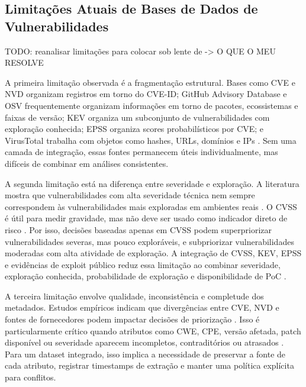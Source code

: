 \subsection{Limitações Atuais de Bases de Dados de Vulnerabilidades}

TODO: reanalisar limitações para colocar sob lente de -> O QUE O MEU RESOLVE

A primeira limitação observada é a fragmentação estrutural. Bases como CVE e NVD organizam registros em torno do CVE-ID; GitHub Advisory Database e OSV frequentemente organizam informações em torno de pacotes, ecossistemas e faixas de versão; KEV organiza um subconjunto de vulnerabilidades com exploração conhecida; EPSS organiza scores probabilísticos por CVE; e VirusTotal trabalha com objetos como hashes, URLs, domínios e IPs \cite{cve_program_overview,nvd_home,github_advisory_database_docs,osv_database,osv_schema,cisa_kev_catalog,first_epss,virustotal_api_v3}. Sem uma camada de integração, essas fontes permanecem úteis individualmente, mas difíceis de combinar em análises consistentes.

A segunda limitação está na diferença entre severidade e exploração. A literatura mostra que vulnerabilidades com alta severidade técnica nem sempre correspondem às vulnerabilidades mais exploradas em ambientes reais \cite{allodi_massacci_2014_cvss_exploits}. O CVSS é útil para medir gravidade, mas não deve ser usado como indicador direto de risco \cite{nvd_cvss_metrics,first_cvss}. Por isso, decisões baseadas apenas em CVSS podem superpriorizar vulnerabilidades severas, mas pouco exploráveis, e subpriorizar vulnerabilidades moderadas com alta atividade de exploração. A integração de CVSS, KEV, EPSS e evidências de exploit público reduz essa limitação ao combinar severidade, exploração conhecida, probabilidade de exploração e disponibilidade de PoC \cite{allodi_massacci_2014_cvss_exploits,cisa_kev_catalog,first_epss,exploitdb}.

A terceira limitação envolve qualidade, inconsistência e completude dos metadados. Estudos empíricos indicam que divergências entre CVE, NVD e fontes de fornecedores podem impactar decisões de priorização \cite{jiang_2021_data_inconsistency}. Isso é particularmente crítico quando atributos como CWE, CPE, versão afetada, patch disponível ou severidade aparecem incompletos, contraditórios ou atrasados \cite{nguyen_massacci_2013_nvd_versions,jiang_2021_data_inconsistency}. Para um dataset integrado, isso implica a necessidade de preservar a fonte de cada atributo, registrar timestamps de extração e manter uma política explícita para conflitos.

